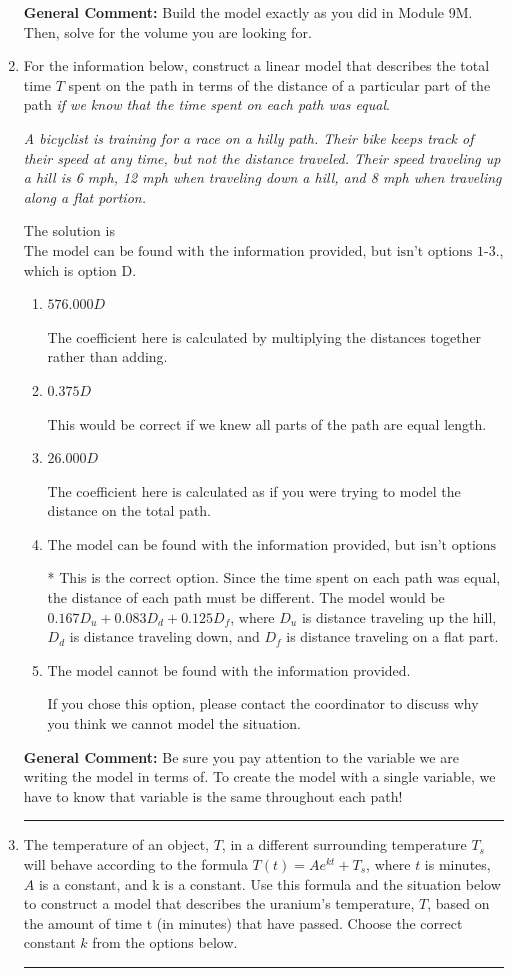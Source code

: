 \documentclass{extbook}[14pt]
\newcommand{\litem}[1]{\item #1

\rule{\textwidth}{0.4pt}}
\begin{document}
\begin{enumerate}
{\textbf{General Comment:} Build the model exactly as you did in Module 9M. Then, solve for the volume you are looking for.
}
\litem{
For the information below, construct a linear model that describes the total time $T$ spent on the path in terms of the distance of a particular part of the path \textit{if we know that the time spent on each path was equal}.

\begin{center}
    \textit{ A bicyclist is training for a race on a hilly path. Their bike keeps track of their speed at any time, but not the distance traveled. Their speed traveling up a hill is 6 mph, 12 mph when traveling down a hill, and 8 mph when traveling along a flat portion. }
\end{center}
The solution is \( \text{The model can be found with the information provided, but isn't options 1-3.} \), which is option D.\begin{enumerate}[label=\Alph*.]
\item \( 576.000 D \)

The coefficient here is calculated by multiplying the distances together rather than adding.
\item \( 0.375 D \)

This would be correct if we knew all parts of the path are equal length.
\item \( 26.000 D \)

The coefficient here is calculated as if you were trying to model the distance on the total path.
\item \( \text{The model can be found with the information provided, but isn't options 1-3.} \)

* This is the correct option. Since the time spent on each path was equal, the distance of each path must be different. The model would be $0.167D_u + 0.083D_d + 0.125D_f$, where $D_u$ is distance traveling up the hill, $D_d$ is distance traveling down, and $D_f$ is distance traveling on a flat part.
\item \( \text{The model cannot be found with the information provided.} \)

If you chose this option, please contact the coordinator to discuss why you think we cannot model the situation.
\end{enumerate}

\textbf{General Comment:} Be sure you pay attention to the variable we are writing the model in terms of. To create the model with a single variable, we have to know that variable is the same throughout each path!
}
\litem{
The temperature of an object, $T$, in a different surrounding temperature $T_s$ will behave according to the formula $T(t) = Ae^{kt} + T_s$, where $t$ is minutes, $A$ is a constant, and k is a constant. Use this formula and the situation below to construct a model that describes the uranium's temperature, $T$, based on the amount of time t (in minutes) that have passed. Choose the correct constant $k$ from the options below.

}
\end{enumerate}
\end{document}
